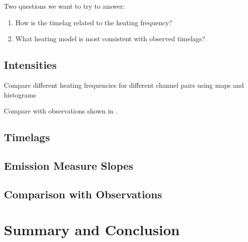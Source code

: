 \documentclass[preprint,linenumbers]{aastex62}
\begin{document}
Two questions we want to try to answer:
\begin{enumerate}
    \item How is the timelag related to the heating frequency?
    \item What heating model is most consistent with observed timelags?
\end{enumerate}

\subsection{Intensities}
Compare different heating frequencies for different channel pairs using maps and histograms

Compare with observations shown in \citet{viall_survey_2017}.

\subsection{Timelags}

\subsection{Emission Measure Slopes}

\subsection{Comparison with Observations}
\label{compare_obs}

\section{Summary and Conclusion}
\label{conclusions}
\acknowledgments


\end{document}
